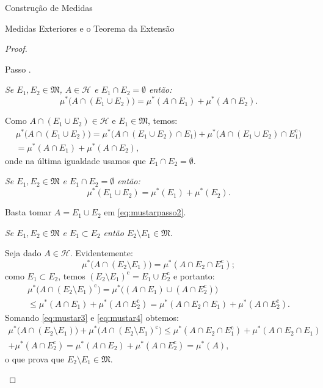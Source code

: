 \documentclass[oneside,final,11pt]{amsbook}
\newcommand{\compl}{\mathrm c}
\newcounter{contastep}
\newenvironment{stepindent}{\setcounter{contastep}{1}
\begin{list} {Passo \arabic{contastep}.}
{\usecounter{contastep}
\setlength{\leftmargin}{10pt}
\setlength{\rightmargin}{10pt}
\setlength{\labelsep}{5pt}
\setlength{\itemsep}{10pt}
\setlength{\topsep}{10pt}}}
{\end{list}}
\theoremstyle{remark}\newtheorem{exercise}{Exercício}[chapter]
\theoremstyle{remark}\newtheorem{*exercise}[exercise]{\hbox to 0pt{\hskip 0pt minus 1fil*}Exercício}
\theoremstyle{definition}\newtheorem{exdefin}{Definição}[chapter]
\theoremstyle{plain}\newtheorem{teo}{Teorema}[section]
\theoremstyle{plain}\newtheorem{lem}[teo]{Lema}
\theoremstyle{plain}\newtheorem{prop}[teo]{Proposição}
\theoremstyle{plain}\newtheorem{cor}[teo]{Corolário}
\theoremstyle{definition}\newtheorem{defin}[teo]{Definição}
\theoremstyle{remark}\newtheorem{rem}[teo]{Observação}
\theoremstyle{definition}\newtheorem{notation}[teo]{Notação}
\theoremstyle{definition}\newtheorem{convention}[teo]{Convenção}
\theoremstyle{definition}\newtheorem{example}[teo]{Exemplo}
\numberwithin{section}{chapter}
\numberwithin{equation}{section}
\begin{document}
\begin{chapter}{Construção de Medidas}
\begin{section}{Medidas Exteriores e o Teorema da Extensão}
\begin{proof}
\begin{stepindent}
\item\label{itm:mustaruniao2}
{\em Se $E_1,E_2\in\mathfrak M$, $A\in\mathcal H$ e $E_1\cap E_2=\emptyset$ então:}
\begin{equation}\label{eq:mustarpasso2}
\mu^*\big(A\cap(E_1\cup E_2)\big)=\mu^*(A\cap E_1)+\mu^*(A\cap E_2).
\end{equation}

Como $A\cap(E_1\cup E_2)\in\mathcal H$ e $E_1\in\mathfrak M$, temos:
\begin{multline*}
\mu^*\big(A\cap(E_1\cup E_2)\big)=\mu^*\big(A\cap(E_1\cup E_2)\cap E_1\big)+
\mu^*\big(A\cap(E_1\cup E_2)\cap E_1^\compl\big)\\
=\mu^*(A\cap E_1)+\mu^*(A\cap E_2),
\end{multline*}
onde na última igualdade usamos que $E_1\cap E_2=\emptyset$.

\item {\em Se $E_1,E_2\in\mathfrak M$ e $E_1\cap E_2=\emptyset$ então:}
\[\mu^*(E_1\cup E_2)=\mu^*(E_1)+\mu^*(E_2).\]

Basta tomar $A=E_1\cup E_2$ em \eqref{eq:mustarpasso2}.

\item\label{itm:mustardiffprop}
{\em Se $E_1,E_2\in\mathfrak M$ e $E_1\subset E_2$ então $E_2\setminus E_1\in\mathfrak M$}.

Seja dado $A\in\mathcal H$. Evidentemente:
\begin{equation}\label{eq:mustar3}
\mu^*\big(A\cap(E_2\setminus E_1)\big)=\mu^*(A\cap E_2\cap E_1^\compl);
\end{equation}
como $E_1\subset E_2$, temos $(E_2\setminus E_1)^\compl=E_1\cup E_2^\compl$ e portanto:
\begin{multline}\label{eq:mustar4}
\mu^*\big(A\cap(E_2\setminus E_1)^\compl\big)=\mu^*\big((A\cap E_1)\cup(A\cap E_2^\compl)\big)
\\\le\mu^*(A\cap E_1)+\mu^*(A\cap E_2^\compl)
=\mu^*(A\cap E_2\cap E_1)+\mu^*(A\cap E_2^\compl).
\end{multline}
Somando \eqref{eq:mustar3} e \eqref{eq:mustar4} obtemos:
\begin{multline*}
\mu^*\big(A\cap(E_2\setminus E_1)\big)+\mu^*\big(A\cap(E_2\setminus E_1)^\compl\big)
\le\mu^*(A\cap E_2\cap E_1^\compl)+\mu^*(A\cap E_2\cap E_1)\\
+\mu^*(A\cap E_2^\compl)=\mu^*(A\cap E_2)+\mu^*(A\cap E_2^\compl)=\mu^*(A),
\end{multline*}
o que prova que $E_2\setminus E_1\in\mathfrak M$.


\end{stepindent}
\end{proof}
\end{section}
\end{chapter}
\end{document}
